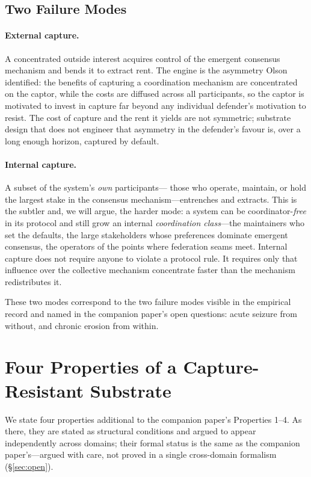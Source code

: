 \documentclass[11pt]{article}
\theoremstyle{definition}
\theoremstyle{plain}
\begin{document}
\subsection{Two Failure Modes}

\paragraph{External capture.} A concentrated outside interest acquires control of
the emergent consensus mechanism and bends it to extract rent. The engine is the
asymmetry Olson~\cite{olson1965} identified: the benefits of capturing a coordination
mechanism are concentrated on the captor, while the costs are diffused across all
participants, so the captor is motivated to invest in capture far beyond any
individual defender's motivation to resist. The cost of capture and the rent it
yields are not symmetric; substrate design that does not engineer that asymmetry
in the defender's favour is, over a long enough horizon, captured by default.

\paragraph{Internal capture.} A subset of the system's \emph{own} participants---
those who operate, maintain, or hold the largest stake in the consensus
mechanism---entrenches and extracts. This is the subtler and, we will argue, the
harder mode: a system can be coordinator-\emph{free} in its protocol and still grow
an internal \emph{coordination class}---the maintainers who set the defaults, the
large stakeholders whose preferences dominate emergent consensus, the operators of
the points where federation seams meet. Internal capture does not require anyone to
violate a protocol rule. It requires only that influence over the collective
mechanism concentrate faster than the mechanism redistributes it.

These two modes correspond to the two failure modes visible in the empirical record
and named in the companion paper's open questions: acute seizure from without, and
chronic erosion from within.

\section{Four Properties of a Capture-Resistant Substrate}
\label{sec:properties}

We state four properties additional to the companion paper's Properties 1--4. As
there, they are stated as structural conditions and argued to appear independently
across domains; their formal status is the same as the companion paper's---argued
with care, not proved in a single cross-domain formalism (\S\ref{sec:open}).
\end{document}
